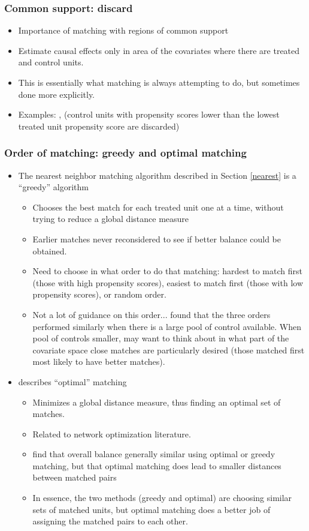 \documentclass[11pt,titlepage]{article}
\begin{document}
\subsubsection{Common support: discard}
\begin{itemize}
\item Importance of matching with regions of common support
\item Estimate causal effects only in area of the covariates where
  there are treated and control units.
\item This is essentially what matching is always attempting to do,
  but sometimes done more explicitly.
\item Examples: \cite{KinZen02}, \cite{DehWah99} (control units with
  propensity scores lower than the lowest treated unit propensity
  score are discarded)
\end{itemize} 

\subsubsection{Order of matching: greedy and optimal matching}
\begin{itemize}
\item The nearest neighbor matching algorithm described in Section
  \ref{nearest} is a ``greedy'' algorithm
\begin{itemize} \item Chooses the best match for each treated unit one at a time, without trying to reduce a global distance measure
\item Earlier matches never reconsidered to see if better balance
  could be obtained.
\item Need to choose in what order to do that matching: hardest to
  match first (those with high propensity scores), easiest to match
  first (those with low propensity scores), or random order.
\item Not a lot of guidance on this order...\cite{Rubin73a} found that
  the three orders performed similarly when there is a large pool of
  control available.  When pool of controls smaller, may want to think
  about in what part of the covariate space close matches are
  particularly desired (those matched first most likely to have better
  matches).
\end{itemize}
\item \cite{Rosenbaum02} describes ``optimal'' matching
\begin{itemize} \item Minimizes a global distance measure, thus finding an optimal set of matches.  
\item Related to network optimization literature.
\item \cite{GuRos93} find that overall balance generally similar using
  optimal or greedy matching, but that optimal matching does lead to
  smaller distances between matched pairs
\item In essence, the two methods (greedy and optimal) are choosing
  similar sets of matched units, but optimal matching does a better
  job of assigning the matched pairs to each other.
\end{itemize}
\end{itemize}
\end{document}
